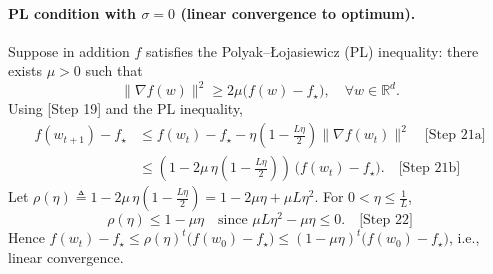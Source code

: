 \documentclass[11pt]{article}
\newcommand{\R}{\mathbb{R}}
\begin{document}
\paragraph{PL condition with $\sigma=0$ (linear convergence to optimum).}
Suppose in addition $f$ satisfies the Polyak--{\L}ojasiewicz (PL) inequality: there exists $\mu>0$ such that
\[
\|\nabla f(w)\|^2 \ge 2\mu\big(f(w)-f_\star\big), \quad \forall w\in\R^d.
\]
Using [Step 19] and the PL inequality,
\begin{align*}
f(w_{t+1}) - f_\star
&\le f(w_t) - f_\star - \eta\!\left(1-\frac{L\eta}{2}\right)\!\|\nabla f(w_t)\|^2 \quad \text{[Step 21a]}\\
&\le \left(1 - 2\mu\,\eta\!\left(1-\frac{L\eta}{2}\right)\right)\,\big(f(w_t)-f_\star\big). \quad \text{[Step 21b]}
\end{align*}
Let $\rho(\eta)\triangleq 1 - 2\mu\,\eta\left(1-\frac{L\eta}{2}\right) = 1 - 2\mu\eta + \mu L\eta^2$. For $0<\eta\le \tfrac{1}{L}$,
\[
\rho(\eta) \le 1 - \mu\eta \quad \text{since } \mu L\eta^2 - \mu\eta \le 0. \quad \text{[Step 22]}
\]
Hence $f(w_t)-f_\star \le \rho(\eta)^t \big(f(w_0)-f_\star\big) \le (1-\mu\eta)^t\big(f(w_0)-f_\star\big)$, i.e., linear convergence.
\end{document}
